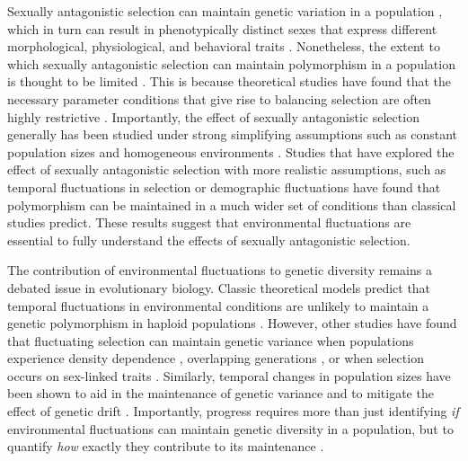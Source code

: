 \documentclass[12pt]{article}
\begin{document}
Sexually antagonistic selection can maintain genetic variation in a population \citep{chippindale2001negative,gavrilets2014sexual}, which in turn can result in phenotypically distinct sexes that express different morphological, physiological, and behavioral traits \citep{mori2017sexual,connallon2018environmental}. Nonetheless,
the extent to which sexually antagonistic selection can maintain polymorphism in a population is thought to be limited \citep{connallon2012general,connallon2018environmental}. This is because theoretical studies have found that the necessary parameter conditions that give rise to balancing selection are often highly restrictive \citep{kidwell1977regions,pamilo1979genic,hedrick1999antagonistic,curtsinger1994antagonistic}. Importantly, the effect of sexually antagonistic selection generally has been studied under strong simplifying assumptions such as constant population sizes and homogeneous environments  \citep{kidwell1977regions, pamilo1979genic, immler2012ploidally}. Studies that have explored the effect of sexually antagonistic selection with more realistic assumptions, such as temporal fluctuations in selection \citep{connallon_evolutionary_2018} or demographic fluctuations \citep{connallon2012general} have found that polymorphism can be maintained in a much wider set of conditions than classical studies predict. These results suggest that environmental fluctuations are essential to fully understand the effects of sexually antagonistic selection.

The contribution of environmental fluctuations to genetic diversity remains a debated issue in evolutionary biology. Classic theoretical models predict that temporal fluctuations in environmental conditions are unlikely to maintain a genetic polymorphism in haploid populations \citep{dempster1955maintenance,hedrick1974genetic,hedrick1986genetic}. However, other studies have found that fluctuating selection can maintain genetic variance when populations experience density dependence \citep{dean2005protecting}, overlapping generations \citep{ellner1994role, ellner1996patterns}, or when selection occurs on sex-linked traits \citep{reinhold2000maintenance}. Similarly, temporal changes in population sizes have been shown to aid in the maintenance of genetic variance \citep{whitlock1992temporal} and to mitigate the effect of genetic drift \citep{pemberton1996maintenance,nunney2002effective}. Importantly, progress requires more than just identifying \textit{if} environmental fluctuations can maintain genetic diversity in a population, but to quantify \textit{how} exactly they contribute to its maintenance \citep{ellner2016quantify}.
\end{document}
